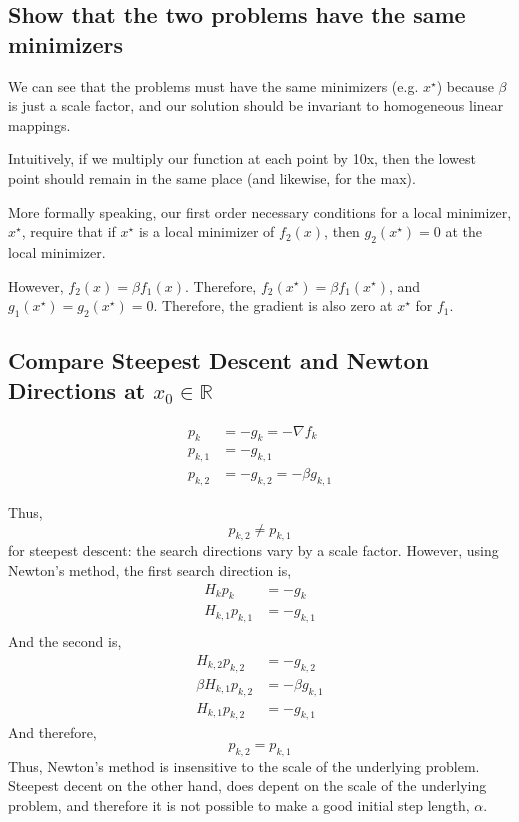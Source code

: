 \documentclass{article}
\begin{document}
\subsection{Show that the two problems have the same minimizers}

We can see that the problems must have the same minimizers
(e.g. $x^\star$) because $\beta$ is just a scale factor, and our solution
should be invariant to homogeneous linear mappings. 

Intuitively, if we multiply our function at each point by 10x, then 
the lowest point should remain in the same place (and likewise, for the
max). 

More formally speaking, our first order necessary conditions for a local
minimizer, $x^\star$, require that if $x^\star$ is a local minimizer of
$f_2(x)$, then $g_2(x^\star) = 0 $ at the local minimizer. 

However, $f_2(x) = \beta f_1(x)$. Therefore,  $f_2(x^\star) = \beta
f_1(x^\star)$, and $g_1(x^\star) = g_2(x^\star) = 0 $. Therefore, the
gradient is also zero at $x^\star$ for $f_1$.

\subsection{Compare Steepest Descent and Newton Directions at $x_0 \in \mathbb{R}$}

\begin{align*}
 p_k&=-g_k = -\nabla f_k\\
 p_{k,1}&=-g_{k,1}\\
 p_{k,2}&=-g_{k,2} = -\beta g_{k,1}
\end{align*}

Thus, 
\begin{equation}
p_{k,2} \ne p_{k,1}
\end{equation}
for steepest descent: the search directions
vary by a scale factor. However, using Newton's method, the first search
direction is,
\begin{align*}
 H_k p_k&=-g_k \\
 H_{k,1} p_{k,1}&=-g_{k,1}\\
\end{align*}
And the second is,
\begin{align*}
 H_{k,2} p_{k,2}&=-g_{k,2}\\
 \beta H_{k,1} p_{k,2}&=- \beta g_{k,1}\\
 H_{k,1} p_{k,2}&=-g_{k,1}
\end{align*}
And therefore, 
\begin{equation}
p_{k,2} = p_{k,1}
\end{equation}
Thus, Newton's method is insensitive to the scale of the underlying
problem. Steepest decent on the other hand, does depent on the scale of
the underlying problem, and therefore it is not possible to make a good
initial step length, $\alpha$.
\end{document}

